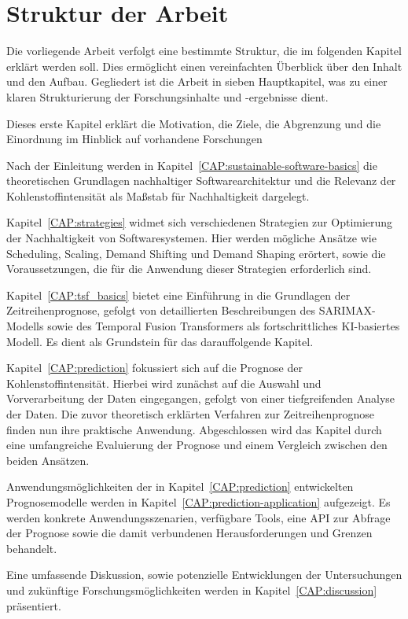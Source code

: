 \section{Struktur der Arbeit}
Die vorliegende Arbeit verfolgt eine bestimmte Struktur, die im folgenden Kapitel erklärt werden soll.
Dies ermöglicht einen vereinfachten Überblick über den Inhalt und den Aufbau.
Gegliedert ist die Arbeit in sieben Hauptkapitel, was zu einer klaren Strukturierung der Forschungsinhalte und -ergebnisse dient.

Dieses erste Kapitel erklärt die Motivation, die Ziele, die Abgrenzung und die Einordnung im Hinblick auf vorhandene Forschungen

Nach der Einleitung werden in Kapitel~\ref{CAP:sustainable-software-basics} die theoretischen Grundlagen nachhaltiger Softwarearchitektur und die Relevanz der Kohlenstoffintensität als Maßstab für Nachhaltigkeit dargelegt.

\noindent Kapitel~\ref{CAP:strategies} widmet sich verschiedenen Strategien zur Optimierung der Nachhaltigkeit von Softwaresystemen.
Hier werden mögliche Ansätze wie Scheduling, Scaling, Demand Shifting und Demand Shaping erörtert, sowie die Voraussetzungen, die für die Anwendung dieser Strategien erforderlich sind.

Kapitel~\ref{CAP:tsf_basics} bietet eine Einführung in die Grundlagen der Zeitreihenprognose, gefolgt von detaillierten Beschreibungen des SARIMAX-Modells sowie des Temporal Fusion Transformers als fortschrittliches KI-basiertes Modell.
Es dient als Grundstein für das darauffolgende Kapitel.

Kapitel~\ref{CAP:prediction} fokussiert sich auf die Prognose der Kohlenstoffintensität.
Hierbei wird zunächst auf die Auswahl und Vorverarbeitung der Daten eingegangen, gefolgt von einer tiefgreifenden Analyse der Daten.
Die zuvor theoretisch erklärten Verfahren zur Zeitreihenprognose finden nun ihre praktische Anwendung.
Abgeschlossen wird das Kapitel durch eine umfangreiche Evaluierung der Prognose und einem Vergleich zwischen den beiden Ansätzen.

Anwendungsmöglichkeiten der in Kapitel~\ref{CAP:prediction} entwickelten Prognosemodelle werden in Kapitel~\ref{CAP:prediction-application} aufgezeigt.
Es werden konkrete Anwendungsszenarien, verfügbare Tools, eine API zur Abfrage der Prognose sowie die damit verbundenen Herausforderungen und Grenzen behandelt.

Eine umfassende Diskussion, sowie potenzielle Entwicklungen der Untersuchungen und zukünftige Forschungsmöglichkeiten werden in Kapitel~\ref{CAP:discussion} präsentiert.

